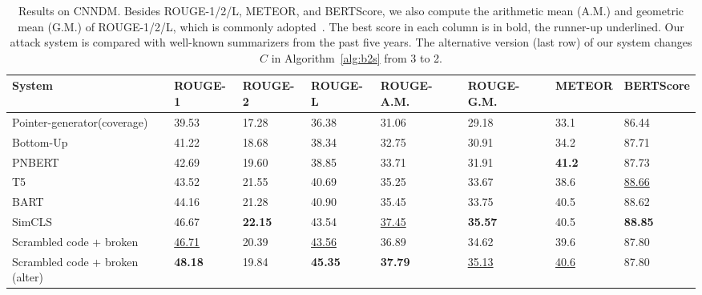 \documentclass[11pt]{article}
\theoremstyle{remark}
\begin{document}
\begin{table*}[t]
\scriptsize
\begin{tabular}{llllllll}
\hline
System                                        & ROUGE-1 & ROUGE-2 & ROUGE-L & ROUGE-A.M. & ROUGE-G.M. & METEOR & BERTScore \\
\hline
Pointer-generator(coverage)~\cite{see-etal-2017-get} & 39.53   & 17.28   & 36.38   & 31.06    & 29.18    & 33.1  & 86.44    \\
Bottom-Up~\cite{gehrmann-etal-2018-bottom}           & 41.22   & 18.68   & 38.34   & 32.75    & 30.91    & 34.2  & 87.71    \\
PNBERT~\cite{zhong-etal-2019-searching}             & 42.69   & 19.60   & 38.85   & 33.71    & 31.91    & \textbf{41.2}  & 87.73    \\
T5~\cite{raffel2019exploring}                 & 43.52   & 21.55   & 40.69   & 35.25    & 33.67    & 38.6  & \underline{88.66}    \\
BART~\cite{lewis-etal-2020-bart}                     & 44.16   & 21.28   & 40.90   & 35.45    & 33.75    & 40.5  & 88.62    \\
SimCLS~\cite{liu-liu-2021-simcls}                   & 46.67   & \textbf{22.15}   & 43.54   & \underline{37.45}    & \textbf{35.57}    & 40.5  & \textbf{88.85}    \\
\hline
Scrambled code + broken                       & \underline{46.71}   & 20.39   & \underline{43.56}   & 36.89    & 34.62    & 39.6  & 87.80     \\
Scrambled code + broken   (alter)             & \textbf{48.18}   & 19.84   & \textbf{45.35}   & \textbf{37.79}    & \underline{35.13}    & \underline{40.6}  & 87.80    \\
\hline
\end{tabular}
\caption{Results on CNNDM. Besides ROUGE-1/2/L, METEOR, and BERTScore, we also compute the arithmetic mean (A.M.) and geometric mean (G.M.) of ROUGE-1/2/L, which is commonly adopted~\cite{zhang-etal-2019-pretraining,bae-etal-2019-summary,chowdhery2022palm}. The best score in each column is in bold, the runner-up underlined. Our attack system is compared with well-known summarizers from the past five years. The alternative version (last row) of our system changes $C$ in Algorithm~\ref{alg:b2s} from 3 to 2.}
\label{tab:result}
\end{table*}
\end{document}
